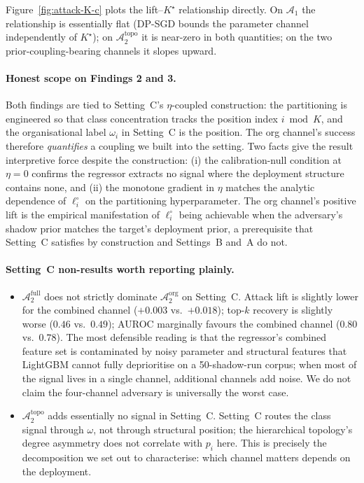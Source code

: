 \documentclass[letterpaper,journal]{IEEEtran}
\newcommand{\Adv}{\mathcal{A}}
\begin{document}
Figure~\ref{fig:attack-K-c} plots the lift--$K^\star$ relationship
directly. On $\Adv_1$ the relationship is essentially flat (DP-SGD
bounds the parameter channel independently of $K^\star$);
on $\Adv_2^{\text{topo}}$ it is near-zero in both quantities; on the
two prior-coupling-bearing channels it slopes upward.

\paragraph{Honest scope on Findings 2 and 3.}
Both findings are tied to Setting~C's $\eta$-coupled construction:
the partitioning is engineered so that class concentration tracks the
position index $i \bmod K$, and the organisational label $\omega_i$
in Setting~C is the position. The org channel's success therefore
\emph{quantifies} a coupling we built into the setting. Two facts
give the result interpretive force despite the construction: (i) the
calibration-null condition at $\eta=0$ confirms the regressor
extracts no signal where the deployment structure contains none, and
(ii) the monotone gradient in $\eta$ matches the analytic dependence
of $\ell_i^\circ$ on the partitioning hyperparameter. The org
channel's positive lift is the empirical manifestation of
$\ell_i^\circ$ being achievable when the adversary's shadow prior
matches the target's deployment prior, a prerequisite that Setting~C
satisfies by construction and Settings~B and~A do not.

\paragraph{Setting~C non-results worth reporting plainly.}
\begin{itemize}[topsep=2pt,itemsep=2pt,leftmargin=*]
\item $\Adv_2^{\text{full}}$ does not strictly dominate
  $\Adv_2^{\text{org}}$ on Setting~C. Attack lift is slightly lower for
  the combined channel ($+0.003$ vs.\ $+0.018$); top-$k$ recovery is
  slightly worse ($0.46$ vs.\ $0.49$); AUROC marginally favours the
  combined channel ($0.80$ vs.\ $0.78$). The most defensible reading is
  that the regressor's combined feature set is contaminated by noisy
  parameter and structural features that LightGBM cannot fully
  deprioritise on a 50-shadow-run corpus; when most of the signal
  lives in a single channel, additional channels add noise. We do not
  claim the four-channel adversary is universally the worst case.
\item $\Adv_2^{\text{topo}}$ adds essentially no signal in
  Setting~C. Setting~C routes the class signal through $\omega$, not
  through structural position; the hierarchical topology's degree
  asymmetry does not correlate with $p_i$ here. This is precisely
  the decomposition we set out to characterise: which channel matters
  depends on the deployment.
\end{itemize}
\end{document}
